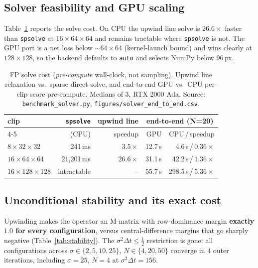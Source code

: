 \subsection{Solver feasibility and GPU scaling}
\label{sec:solver-results}
Table~\ref{tab:solver} reports the solve cost. On CPU the upwind line solve is
$26.6\times$ faster than \texttt{spsolve} at $16\times64\times64$ and remains
tractable where \texttt{spsolve} is not. The GPU port is a net loss below
$\sim\!64\times64$ (kernel-launch bound) and wins clearly at $128\times128$,
so the backend defaults to \texttt{auto} and selects NumPy below 96\,px.

\begin{table}[t]
  \centering
  \small
  \begin{tabular}{lrrrr}
    \toprule
    clip & \texttt{spsolve} & upwind line & \multicolumn{2}{c}{end-to-end (N{=}20)}\\
    \cmidrule(l){4-5}
         & (CPU) & speedup & GPU & CPU\,/\,speedup\\
    \midrule
    $8\times32\times32$   & 241\,ms    & $3.5\times$  & 12.7\,s & 4.6\,s\,/\,$0.36\times$\\
    $16\times64\times64$  & 21{,}201\,ms & $\mathbf{26.6\times}$ & 31.1\,s & 42.2\,s\,/\,$1.36\times$\\
    $16\times128\times128$& intractable & --          & 55.7\,s & 298.5\,s\,/\,$\mathbf{5.36\times}$\\
    \bottomrule
  \end{tabular}
  \caption{FP solve cost (\emph{pre-compute} wall-clock, not sampling). Upwind
  line relaxation vs.\ sparse direct solve, and end-to-end GPU vs.\ CPU per-clip
  score pre-compute. Medians of 3, RTX 2000 Ada. Source:
  \texttt{benchmark\_solver.py}, \texttt{figures/solver\_end\_to\_end.csv}.}
  \label{tab:solver}
\end{table}

\subsection{Unconditional stability and its exact cost}
\label{sec:stab}
Upwinding makes the operator an M-matrix with row-dominance margin \textbf{exactly
$1.0$ for every configuration}, versus central-difference margins that go
sharply negative (Table~\ref{tab:stability}). The $\sigma^2\Delta t\le\tfrac12$
restriction is gone: all configurations across $\sigma\in\{2,5,10,25\}$,
$N\in\{4,20,50\}$ converge in $4$ outer iterations, including $\sigma{=}25$,
$N{=}4$ at $\sigma^2\Delta t = 156$.

